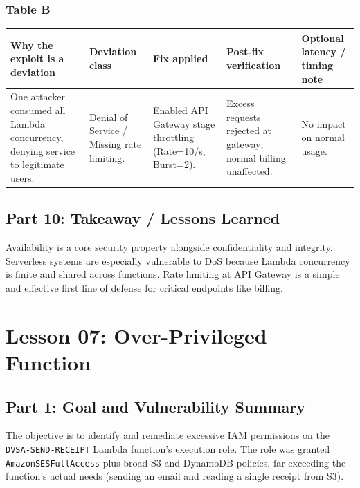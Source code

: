 \documentclass[12pt]{report}
\begin{document}
\subsection*{Table B}
\begin{table}[H]
  \footnotesize\centering
  \begin{tabularx}{\textwidth}{|Y|Y|Y|Y|Y|}
    \hline
    \textbf{Why the exploit is a deviation} & \textbf{Deviation class} & \textbf{Fix applied} & \textbf{Post-fix verification} & \textbf{Optional latency / timing note} \\
    \hline
    One attacker consumed all Lambda concurrency, denying service to legitimate users. &
    Denial of Service / Missing rate limiting. &
    Enabled API Gateway stage throttling (Rate=10/s, Burst=2). &
    Excess requests rejected at gateway; normal billing unaffected. &
    No impact on normal usage. \\
    \hline
  \end{tabularx}
\end{table}

\section{Part 10: Takeaway / Lessons Learned}
Availability is a core security property alongside confidentiality and integrity. Serverless systems are especially vulnerable to DoS because Lambda concurrency is finite and shared across functions. Rate limiting at API Gateway is a simple and effective first line of defense for critical endpoints like billing.

\clearpage

\chapter{Lesson 07: Over-Privileged Function}

\section{Part 1: Goal and Vulnerability Summary}
The objective is to identify and remediate excessive IAM permissions on the \texttt{DVSA-SEND-RECEIPT} Lambda function's execution role. The role was granted \texttt{AmazonSESFullAccess} plus broad S3 and DynamoDB policies, far exceeding the function's actual needs (sending an email and reading a single receipt from S3).
\end{document}
